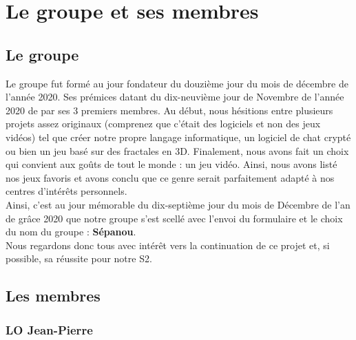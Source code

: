 \documentclass{article}
\begin{document}
\pagebreak

\section{Le groupe et ses membres}

\subsection{Le groupe}

Le groupe fut formé au jour fondateur du douzième jour du mois de décembre de l'année 2020. Ses prémices datant du dix-neuvième jour de Novembre de l'année 2020 de par ses 3 premiers membres. Au début, nous hésitions entre plusieurs projets assez originaux (comprenez que c'était des logiciels et non des jeux vidéos) tel que créer notre propre langage informatique, un logiciel de chat crypté ou bien un jeu basé sur des fractales en 3D. Finalement, nous avons fait un choix qui convient aux goûts de tout le monde : un jeu vidéo. Ainsi, nous avons listé nos jeux favoris et avons conclu que ce genre serait parfaitement adapté à nos centres d'intérêts personnels.\\
Ainsi, c'est au jour mémorable du dix-septième jour du mois de Décembre de l'an de grâce 2020 que notre groupe s'est scellé avec l'envoi du formulaire et le choix du nom du groupe : \textbf{Sépanou}.\\
Nous regardons donc tous avec intérêt vers la continuation de ce projet et, si possible, sa réussite pour notre S2.

\subsection{Les membres}

\subsubsection{LO Jean-Pierre}
\end{document}
